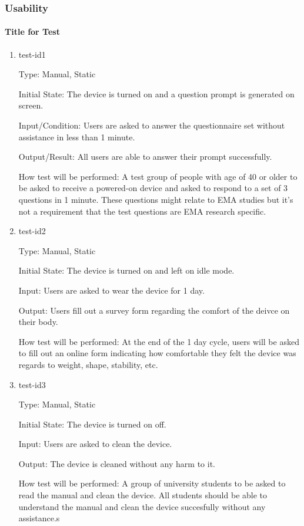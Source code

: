 \documentclass[12pt, titlepage]{article}
\begin{document}
\subsubsection{Usability}
		
\paragraph{Title for Test}

\begin{enumerate}

\item{test-id1\\}

Type: Manual, Static
					
Initial State: The device is turned on and a question prompt is generated on screen.
					
Input/Condition: Users are asked to answer the questionnaire set without assistance in less than 1 minute.
					
Output/Result: All users are able to answer their prompt successfully.
					
How test will be performed: A test group of people with age of 40 or older to be asked to receive a powered-on device and asked to respond to a set of 3 questions in 1 minute. These questions might relate to EMA studies but it's not a requirement that the test questions are EMA research specific.
					
\item{test-id2\\}

Type: Manual, Static
					
Initial State: The device is turned on and left on idle mode.
					
Input: Users are asked to wear the device for 1 day.
					
Output: Users fill out a survey form regarding the comfort of the deivce on their body.
					
How test will be performed: At the end of the 1 day cycle, users will be asked to fill out an online form indicating how comfortable they felt the device was regards to weight, shape, stability, etc.

\item{test-id3\\}

Type: Manual, Static
					
Initial State: The device is turned on off.
					
Input: Users are asked to clean the device.
					
Output: The device is cleaned without any harm to it.
					
How test will be performed: A group of university students to be asked to read the manual and clean the device. All students should be able to understand the manual and clean the device succesfully without any assistance.s

\end{enumerate}
\end{document}
